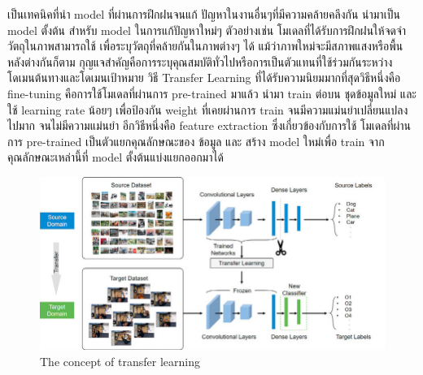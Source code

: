  

เป็นเทคนิคที่นำ model ที่ผ่านการฝึกฝนจนแก้ ปัญหาในงานอื่นๆที่มีความคล้ายคลึงกัน
นำมาเป็น model ตั้งต้น สำหรับ model ในการแก้ปัญหาใหม่ๆ
ตัวอย่างเช่น โมเดลที่ได้รับการฝึกฝนให้จดจำวัตถุในภาพสามารถใช้
เพื่อระบุวัตถุที่คล้ายกันในภาพต่างๆ ได้ 
แม้ว่าภาพใหม่จะมีสภาพแสงหรือพื้นหลังต่างกันก็ตาม
 กุญแจสำคัญคือการระบุคุณสมบัติทั่วไปหรือการเป็นตัวแทนที่ใช้ร่วมกันระหว่างโดเมนต้นทางและโดเมนเป้าหมาย
 วิธี Transfer Learning ที่ได้รับความนิยมมากที่สุดวิธีหนึ่งคือ fine-tuning 
คือการใช้โมเดลที่ผ่านการ  pre-trained  มาแล้ว นำมา train ต่อบน ชุดข้อมูลใหม่
และใช้ learning rate น้อยๆ เพื่อป้องกัน weight ที่เคยผ่านการ train จนมีความแม่นยำเปลี่ยนแปลงไปมาก จนไม่มีความแม่นยำ
อีกวิธีหนึ่งคือ feature extraction ซึ่งเกี่ยวข้องกับการใช้ โมเดลที่ผ่านการ  pre-trained  เป็นตัวแยกคุณลักษณะของ ข้อมูล และ สร้าง model ใหม่เพื่อ train จากคุณลักษณะเหล่านี้ที่ model ตั้งต้นแบ่งแยกออกมาได้
 
\begin{figure}[h]
  \begin{center}
  \includegraphics[scale=0.45]{pic/The-architecture-transfer-learning.png}
  \end{center}
  
  \caption[The concept of transfer learning]{The concept of transfer learning}
  \label{fig:The concept of transfer learning}
  \end{figure}

